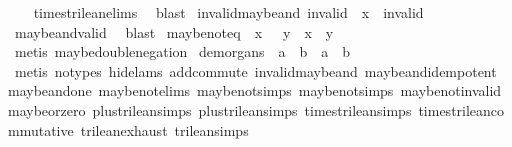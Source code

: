 \begin{isabellebody}
%
\isadelimproof
\ \ %
\endisadelimproof
%
\isatagproof
{}\isamarkupfalse%
\ times{\isacharunderscore}trilean{\isachardot}elims\ \isamarkupfalse%
\ blast%
\endisatagproof
{\isafoldproof}%
%
\isadelimproof
\isanewline
%
\endisadelimproof
\isanewline
{}\isamarkupfalse%
\ invalid{\isacharunderscore}maybe{\isacharunderscore}and{\isacharcolon}\ {\isachardoublequoteopen}invalid\ {\isasymand}\isactrlsub {\isacharquery}\ x\ {\isacharequal}\ invalid{\isachardoublequoteclose}\isanewline
%
\isadelimproof
\ \ %
\endisadelimproof
%
\isatagproof
{}\isamarkupfalse%
\ maybe{\isacharunderscore}and{\isacharunderscore}valid\ \isamarkupfalse%
\ blast%
\endisatagproof
{\isafoldproof}%
%
\isadelimproof
\isanewline
%
\endisadelimproof
\isanewline
{}\isamarkupfalse%
\ maybe{\isacharunderscore}not{\isacharunderscore}eq{\isacharcolon}\ {\isachardoublequoteopen}{\isacharparenleft}{\isasymnot}\isactrlsub {\isacharquery}\ x\ {\isacharequal}\ {\isasymnot}\isactrlsub {\isacharquery}\ y{\isacharparenright}\ {\isacharequal}\ {\isacharparenleft}x\ {\isacharequal}\ y{\isacharparenright}{\isachardoublequoteclose}\isanewline
%
\isadelimproof
\ \ %
\endisadelimproof
%
\isatagproof
{}\isamarkupfalse%
\ {\isacharparenleft}metis\ maybe{\isacharunderscore}double{\isacharunderscore}negation{\isacharparenright}%
\endisatagproof
{\isafoldproof}%
%
\isadelimproof
\isanewline
%
\endisadelimproof
\isanewline
{}\isamarkupfalse%
\ de{\isacharunderscore}morgans{\isacharunderscore}{}{\isacharcolon}\ {\isachardoublequoteopen}{\isasymnot}\isactrlsub {\isacharquery}\ {\isacharparenleft}a\ {\isasymor}\isactrlsub {\isacharquery}\ b{\isacharparenright}\ {\isacharequal}\ {\isacharparenleft}{\isasymnot}\isactrlsub {\isacharquery}a{\isacharparenright}\ {\isasymand}\isactrlsub {\isacharquery}\ {\isacharparenleft}{\isasymnot}\isactrlsub {\isacharquery}b{\isacharparenright}{\isachardoublequoteclose}\isanewline
%
\isadelimproof
\ \ %
\endisadelimproof
%
\isatagproof
{}\isamarkupfalse%
\ {\isacharparenleft}metis\ {\isacharparenleft}no{\isacharunderscore}types{\isacharcomma}\ hide{\isacharunderscore}lams{\isacharparenright}\ add{\isachardot}commute\ invalid{\isacharunderscore}maybe{\isacharunderscore}and\ maybe{\isacharunderscore}and{\isacharunderscore}idempotent\ maybe{\isacharunderscore}and{\isacharunderscore}one\ maybe{\isacharunderscore}not{\isachardot}elims\ maybe{\isacharunderscore}not{\isachardot}simps{\isacharparenleft}{}{\isacharparenright}\ maybe{\isacharunderscore}not{\isachardot}simps{\isacharparenleft}{}{\isacharparenright}\ maybe{\isacharunderscore}not{\isacharunderscore}invalid\ maybe{\isacharunderscore}or{\isacharunderscore}zero\ plus{\isacharunderscore}trilean{\isachardot}simps{\isacharparenleft}{}{\isacharparenright}\ plus{\isacharunderscore}trilean{\isachardot}simps{\isacharparenleft}{}{\isacharparenright}\ times{\isacharunderscore}trilean{\isachardot}simps{\isacharparenleft}{}{\isacharparenright}\ times{\isacharunderscore}trilean{\isacharunderscore}commutative\ trilean{\isachardot}exhaust\ trilean{\isachardot}simps{\isacharparenleft}{}{\isacharparenright}{\isacharparenright}%

\end{isabellebody}
